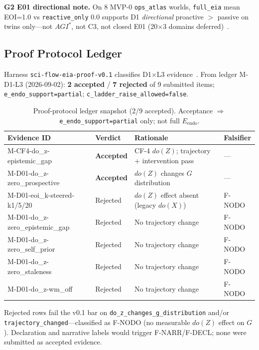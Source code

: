 \documentclass[11pt,a4paper]{article}
\theoremstyle{definition}
\begin{document}
\textbf{G2 E01 directional note.} On 8 MVP-0 \texttt{ops\_atlas} worlds, \texttt{full\_eia} mean EOI=1.0 vs \texttt{reactive\_only} 0.0 supports D1 \emph{directional} proactive $>$ passive on twins only---not $AGI^{*}$, not C3, not closed E01 (20$\times$3 domains deferred)~\cite{kuznetsov2026g2e01}.

\subsection{Proof Protocol Ledger}\label{sec:proof-ledger}

Harness \texttt{sci-flow-eia-proof-v0.1} classifies D1$\times$L3 evidence~\cite{kuznetsov2026proof}. From ledger M-D1-L3 (2026-09-02): \textbf{2 accepted} / \textbf{7 rejected} of 9 submitted items; \texttt{e\_endo\_support=partial}; \texttt{c\_ladder\_raise\_allowed=false}.

\begin{table}[H]
\centering\small
\begin{tabular}{llp{4.5cm}l}
\toprule Evidence ID & Verdict & Rationale & Falsifier \\ \midrule
M-CF4-do\_z-epistemic\_gap & \textbf{Accepted} & CF-4 $do(Z)$; trajectory + intervention pass & --- \\
M-D01-do\_z-zero\_prospective & \textbf{Accepted} & $do(Z)$ changes $G$ distribution & --- \\
M-D01-eoi\_k-steered-k1/5/20 & Rejected & $do(Z)$ effect absent (legacy $do(X)$) & F-NODO \\
M-D01-do\_z-zero\_epistemic\_gap & Rejected & No trajectory change & F-NODO \\
M-D01-do\_z-zero\_self\_prior & Rejected & No trajectory change & F-NODO \\
M-D01-do\_z-zero\_staleness & Rejected & No trajectory change & F-NODO \\
M-D01-do\_z-wm\_off & Rejected & No trajectory change & F-NODO \\ \bottomrule
\end{tabular}
\caption{Proof-protocol ledger snapshot (2/9 accepted). Acceptance $\Rightarrow$ \texttt{e\_endo\_support=partial} only; not full $E_{\mathrm{endo}}$.}
\label{tab:proof-ledger}
\end{table}

Rejected rows fail the v0.1 bar on \texttt{do\_z\_changes\_g\_distribution} and/or \texttt{trajectory\_changed}---classified as F-NODO (no measurable $do(Z)$ effect on $G$). Declaration and narrative labels would trigger F-NARR/F-DECL; none were submitted as accepted evidence.
\end{document}
